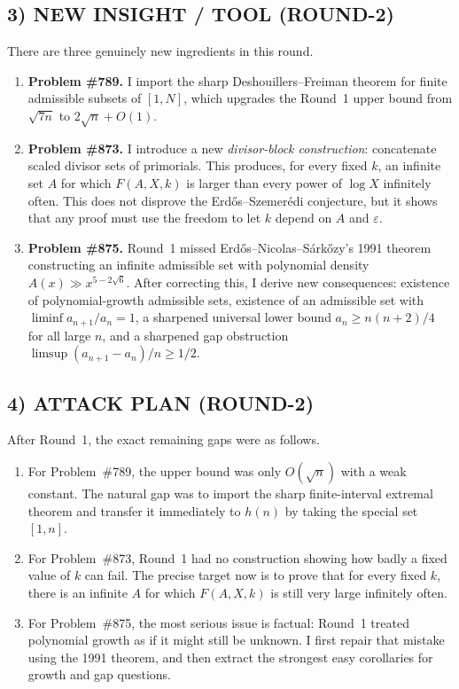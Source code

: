 \subsection*{3) NEW INSIGHT / TOOL (ROUND-2)}

There are three genuinely new ingredients in this round.

\begin{enumerate}
\item \textbf{Problem \#789.} I import the sharp Deshouillers--Freiman theorem for finite admissible subsets of \([1,N]\), which upgrades the Round~1 upper bound from \(\sqrt{7n}\) to \(2\sqrt{n}+O(1)\).
\item \textbf{Problem \#873.} I introduce a new \emph{divisor-block construction}: concatenate scaled divisor sets of primorials. This produces, for every fixed \(k\), an infinite set \(A\) for which \(F(A,X,k)\) is larger than every power of \(\log X\) infinitely often. This does not disprove the Erd\H{o}s--Szemer\'edi conjecture, but it shows that any proof must use the freedom to let \(k\) depend on \(A\) and \(\varepsilon\).
\item \textbf{Problem \#875.} Round~1 missed Erd\H{o}s--Nicolas--S\'ark\H{o}zy's 1991 theorem constructing an infinite admissible set with polynomial density \(A(x)\gg x^{5-2\sqrt6}\). After correcting this, I derive new consequences: existence of polynomial-growth admissible sets, existence of an admissible set with \(\liminf a_{n+1}/a_n = 1\), a sharpened universal lower bound \(a_n\ge n(n+2)/4\) for all large \(n\), and a sharpened gap obstruction \(\limsup (a_{n+1}-a_n)/n\ge 1/2\).
\end{enumerate}

\subsection*{4) ATTACK PLAN (ROUND-2)}

After Round~1, the exact remaining gaps were as follows.

\begin{enumerate}
\item For Problem~\#789, the upper bound was only \(O(\sqrt n)\) with a weak constant. The natural gap was to import the sharp finite-interval extremal theorem and transfer it immediately to \(h(n)\) by taking the special set \([1,n]\).
\item For Problem~\#873, Round~1 had no construction showing how badly a fixed value of \(k\) can fail. The precise target now is to prove that for every fixed \(k\), there is an infinite \(A\) for which \(F(A,X,k)\) is still very large infinitely often.
\item For Problem~\#875, the most serious issue is factual: Round~1 treated polynomial growth as if it might still be unknown. I first repair that mistake using the 1991 theorem, and then extract the strongest easy corollaries for growth and gap questions.
\end{enumerate}

